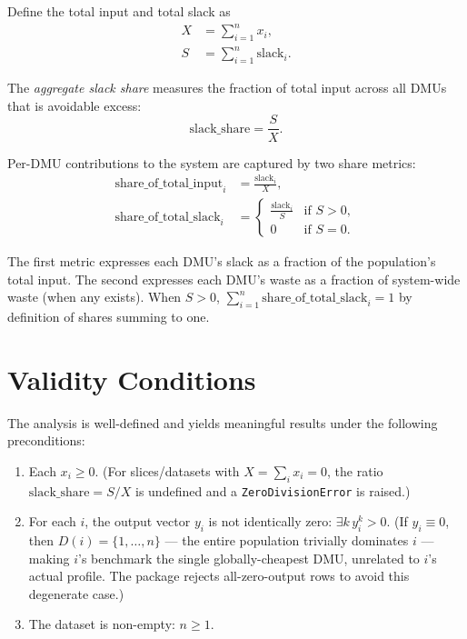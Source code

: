 \documentclass[11pt]{article}
\theoremstyle{definition}
\theoremstyle{plain}
\theoremstyle{remark}
\begin{document}
Define the total input and total slack as
\begin{align}
X &= \sum_{i=1}^{n} x_i, \\
S &= \sum_{i=1}^{n} \text{slack}_i.
\end{align}

The \emph{aggregate slack share} measures the fraction of total input across all DMUs that is avoidable excess:
\begin{equation}
\text{slack\_share} = \frac{S}{X}.
\end{equation}

Per-DMU contributions to the system are captured by two share metrics:
\begin{align}
\text{share\_of\_total\_input}_i &= \frac{\text{slack}_i}{X}, \\
\text{share\_of\_total\_slack}_i &= \begin{cases} \frac{\text{slack}_i}{S} & \text{if } S > 0, \\ 0 & \text{if } S = 0. \end{cases}
\end{align}

The first metric expresses each DMU's slack as a fraction of the population's total input.
The second expresses each DMU's waste as a fraction of system-wide waste (when any exists).
When $S > 0$, $\sum_{i=1}^{n} \text{share\_of\_total\_slack}_i = 1$ by definition of shares summing to one.

\section{Validity Conditions}

The analysis is well-defined and yields meaningful results under the following preconditions:

\begin{enumerate}
\item Each $x_i \ge 0$. (For slices/datasets with $X = \sum_i x_i = 0$, the ratio $\text{slack\_share} = S / X$ is undefined and a \texttt{ZeroDivisionError} is raised.)
\item For each $i$, the output vector $y_i$ is not identically zero: $\exists k \, y_i^k > 0$.
  (If $y_i \equiv 0$, then $D(i) = \{1, \ldots, n\}$ — the entire population trivially dominates $i$ — making $i$'s benchmark the single globally-cheapest DMU, unrelated to $i$'s actual profile. The package rejects all-zero-output rows to avoid this degenerate case.)
\item The dataset is non-empty: $n \ge 1$.
\end{enumerate}
\end{document}
